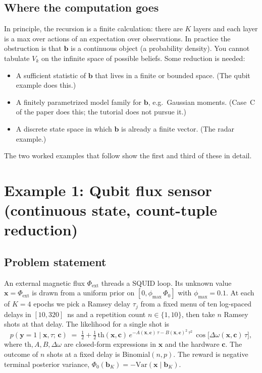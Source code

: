 \documentclass[11pt]{article}
\newcommand{\bc}{\bm{c}}
\newcommand{\bx}{\bm{x}}
\newcommand{\by}{\bm{y}}
\newcommand{\bb}{\bm{b}}
\begin{document}
\subsection{Where the computation goes}

In principle, the recursion is a finite calculation: there are $K$ layers and each layer is a max over actions of an expectation over observations.  In practice the obstruction is that $\bb$ is a continuous object (a probability density).  You cannot tabulate $V_k$ on the infinite space of possible beliefs.  Some reduction is needed:

\begin{itemize}[nosep, leftmargin=*]
\item A sufficient statistic of $\bb$ that lives in a finite or bounded space.  (The qubit example does this.)
\item A finitely parametrized model family for $\bb$, e.g.\ Gaussian moments.  (Case~C of the paper does this; the tutorial does not pursue it.)
\item A discrete state space in which $\bb$ is already a finite vector.  (The radar example.)
\end{itemize}

The two worked examples that follow show the first and third of these in detail.

\section{Example 1: Qubit flux sensor (continuous state, count-tuple reduction)}
\label{sec:qubit}

\subsection{Problem statement}

An external magnetic flux $\Phi_\mathrm{ext}$ threads a SQUID loop.  Its unknown value $\bx = \Phi_\mathrm{ext}$ is drawn from a uniform prior on $[0, \phi_{\max}\, \Phi_0]$ with $\phi_{\max} = 0.1$.  At each of $K = 4$ epochs we pick a Ramsey delay $\tau_j$ from a fixed menu of ten log-spaced delays in $[10, 320]$~ns and a repetition count $n \in \{1, 10\}$, then take $n$ Ramsey shots at that delay.  The likelihood for a single shot is
\begin{equation}
p(\by = 1 \mid \bx, \tau;\, \bc) \;=\; \tfrac{1}{2} + \tfrac{1}{2}\,\mathrm{th}(\bx, \bc)\, e^{-A(\bx, \bc)\,\tau - B(\bx, \bc)^2\, \tau^2}\, \cos\bigl[\Delta\omega(\bx, \bc)\, \tau\bigr],
\label{eq:ramsey}
\end{equation}
where $\mathrm{th}, A, B, \Delta\omega$ are closed-form expressions in $\bx$ and the hardware $\bc$.  The outcome of $n$ shots at a fixed delay is Binomial$(n, p)$.  The reward is negative terminal posterior variance, $\Phi_0(\bb_K) = -\mathrm{Var}(\bx \mid \bb_K)$.
\end{document}

